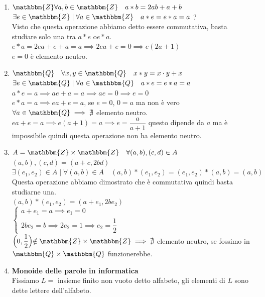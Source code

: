 \documentclass[12pt, letterpaper]{report}
\begin{document}
		\begin{enumerate}
			\item $\mathbbm{Z} \forall a,b \in \mathbbm{Z} \quad a*b = 2ab + a +b$ \\
			$\exists e \in \mathbbm{Z} \mid \forall a \in \mathbbm{Z} \quad a*e=e*a=a$ ? \\
			Visto che questa operazione abbiamo detto essere commutativa, basta studiare solo una tra $a*e$ o$e*a$. \\
			$e*a = 2ea + e + a = a \implies 2ea + e = 0 \implies e(2a + 1)$ \\
			$e=0$ è elemento neutro.
			\item $\mathbbm{Q} \quad \forall x,y \in \mathbbm{Q} \quad x*y=x\cdot y + x$ \\
			$\exists e \in \mathbbm{Q} \mid \forall a \in \mathbbm{Q} \quad a*e=e*a=a$ \\
			$a*e = a \implies ae + a = a \implies ae = 0 \implies e=0$  \\
			$e*a = a \implies ea + e = a$, se $e=0$, $0=a$ ma non è vero $\forall a \in \mathbbm{Q} \implies \nexists$ elemento neutro. \\
			$ea+e=a \implies e(a+1)=a \implies e = \dfrac{a}{a+1}$ questo dipende da $a$ ma è impossibile quindi questa operazione non ha elemento neutro.
			\item $A = \mathbbm{Z} \times \mathbbm{Z} \quad \forall (a,b), (c,d) \in A$ \\
			$(a,b), (c,d) = (a+c, 2bd)$ \\
			$\exists (e_1, e_2)\in A \mid \forall (a,b) \in A \quad (a,b)*(e_1, e_2)=(e_1, e_2) * (a,b)=(a,b)$ \\
			Questa operazione abbiamo dimostrato che è commutativa quindi basta studiarne una. \\
			$(a,b)*(e_1, e_2) = (a+e_1, 2be_2)$ \\
			$\begin{cases}
				a+e_1 = a \implies e_1 = 0 \\
				2be_2 = b \implies 2e_2 = 1 \implies e_2 = \dfrac{1}{2}
			\end{cases}$ \\
			$\Bigl(0, \dfrac{1}{2} \Bigl) \notin \mathbbm{Z} \times \mathbbm{Z} \implies \nexists$ elemento neutro, se fossimo in $\mathbbm{Q} \times \mathbbm{Q}$ funzionerebbe.
			\item \textbf{Monoide delle parole in informatica} \\
			Fissiamo $L=$ insieme finito non vuoto detto alfabeto, gli elementi di $L$ sono dette lettere dell'alfabeto. \\

\end{enumerate}
\end{document}
